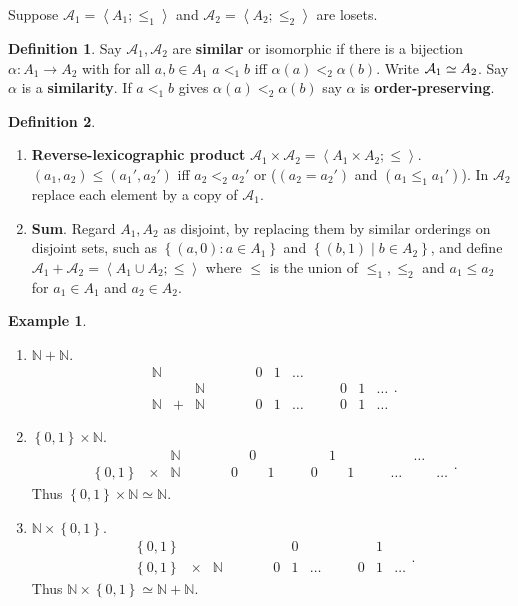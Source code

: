 \documentclass{article}
\newcommand{\N}{\mathbb{N}}
\newcommand{\A}{\mathcal{A}}
\newcommand{\rb}[1]{\left( #1 \right)}
\newcommand{\cb}[1]{\left\{ #1 \right\}}
\newcommand{\ab}[1]{\left\langle #1 \right\rangle}
\theoremstyle{definition}\newtheorem{definition}{Definition}[subsection]
\theoremstyle{definition}\newtheorem{remark}[definition]{Remark}
\theoremstyle{definition}\newtheorem*{example}{Example}
\theoremstyle{definition}\newtheorem*{note}{Note}
\begin{document}

Suppose $ \A_1 = \ab{A_1; \le_1} $ and $ \A_2 = \ab{A_2; \le_2} $ are losets.

\begin{definition}
Say $ \A_1, \A_2 $ are \textbf{similar} or isomorphic if there is a bijection $ \alpha : A_1 \to A_2 $ with for all $ a, b \in A_1 $ $ a <_1 b $ iff $ \alpha\rb{a} <_2 \alpha\rb{b} $. Write $ \A_1 \simeq \mathcal \A_2 $. Say $ \alpha $ is a \textbf{similarity}. If $ a <_1 b $ gives $ \alpha\rb{a} <_2 \alpha\rb{b} $ say $ \alpha $ is \textbf{order-preserving}.
\end{definition}

\begin{definition}
\hfill
\begin{enumerate}
\item \textbf{Reverse-lexicographic product} $ \A_1 \times \A_2 = \ab{A_1 \times A_2; \le} $. $ \rb{a_1, a_2} \le \rb{a_1', a_2'} $ iff $ a_2 <_2 a_2' $ or ($ \rb{a_2 = a_2'} $ and $ \rb{a_1 \le_1 a_1'} $). In $ \A_2 $ replace each element by a copy of $ \A_1 $.
\item \textbf{Sum}. Regard $ A_1, A_2 $ as disjoint, by replacing them by similar orderings on disjoint sets, such as $ \cb{\rb{a, 0} : a \in A_1} $ and $ \cb{\rb{b, 1} \mid b \in A_2} $, and define $ \A_1 + \A_2 = \ab{A_1 \cup A_2; \le} $ where $ \le $ is the union of $ \le_1, \le_2 $ and $ a_1 \le a_2 $ for $ a_1 \in A_1 $ and $ a_2 \in A_2 $.
\end{enumerate}
\end{definition}

\begin{example}
\hfill
\begin{enumerate}
\item $ \N + \N $.
$$
\begin{array}{ccccccccccc}
\N & & & \qquad & 0 & 1 & \dots & \quad & & & \\
& & \N & \qquad & & & & \quad & 0 & 1 & \dots \\
\N & + & \N & \qquad & 0 & 1 & \dots & \quad & 0 & 1 & \dots
\end{array}.
$$
\item $ \cb{0, 1} \times \N $.
$$
\begin{array}{ccccccccccccccc}
& & \N & \qquad & & 0 & & \quad & & 1 & & \quad & & \dots & \\
\cb{0, 1} & \times & \N & \qquad & 0 & & 1 & \quad & 0 & & 1 & \quad & \dots & & \dots
\end{array}.
$$
Thus $ \cb{0, 1} \times \N \simeq \N $.
\item $ \N \times \cb{0, 1} $.
$$
\begin{array}{ccccccccccc}
\cb{0, 1} & & & \qquad & & 0 & & & & 1 & \\
\cb{0, 1} & \times & \N & \qquad & 0 & 1 & \dots & \quad & 0 & 1 & \dots
\end{array}.
$$
Thus $ \N \times \cb{0, 1} \simeq \N + \N $.
\end{enumerate}
\end{example}
\end{document}
